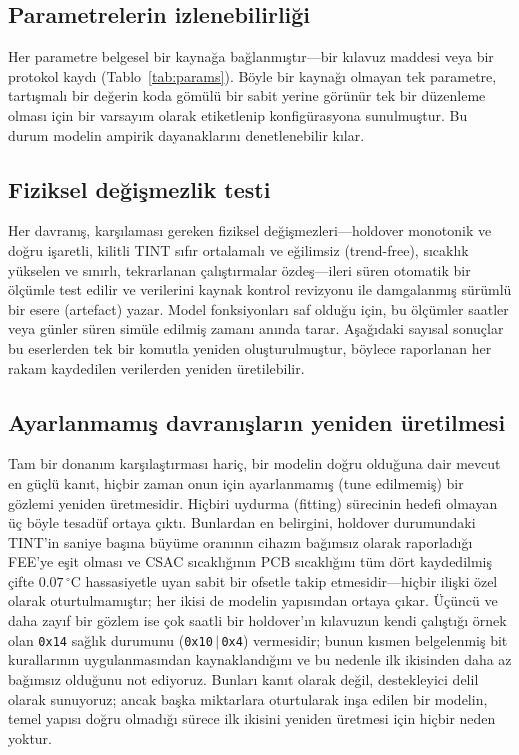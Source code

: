 \documentclass[9pt,twocolumn,a4paper]{extarticle}
\begin{document}
\subsection{Parametrelerin izlenebilirliği}
Her parametre belgesel bir kaynağa bağlanmıştır---bir kılavuz maddesi veya bir protokol kaydı (Tablo~\ref{tab:params}). Böyle bir kaynağı olmayan tek parametre, tartışmalı bir değerin koda gömülü bir sabit yerine görünür tek bir düzenleme olması için bir varsayım olarak etiketlenip konfigürasyona sunulmuştur. Bu durum modelin ampirik dayanaklarını denetlenebilir kılar.

\subsection{Fiziksel değişmezlik testi}
Her davranış, karşılaması gereken fiziksel değişmezleri---holdover monotonik ve doğru işaretli, kilitli TINT sıfır ortalamalı ve eğilimsiz (trend-free), sıcaklık yükselen ve sınırlı, tekrarlanan çalıştırmalar özdeş---ileri süren otomatik bir ölçümle test edilir ve verilerini kaynak kontrol revizyonu ile damgalanmış sürümlü bir esere (artefact) yazar. Model fonksiyonları saf olduğu için, bu ölçümler saatler veya günler süren simüle edilmiş zamanı anında tarar. Aşağıdaki sayısal sonuçlar bu eserlerden tek bir komutla yeniden oluşturulmuştur, böylece raporlanan her rakam kaydedilen verilerden yeniden üretilebilir.

\subsection{Ayarlanmamış davranışların yeniden üretilmesi}
Tam bir donanım karşılaştırması hariç, bir modelin doğru olduğuna dair mevcut en güçlü kanıt, hiçbir zaman onun için ayarlanmamış (tune edilmemiş) bir gözlemi yeniden üretmesidir. Hiçbiri uydurma (fitting) sürecinin hedefi olmayan üç böyle tesadüf ortaya çıktı. Bunlardan en belirgini, holdover durumundaki TINT'in saniye başına büyüme oranının cihazın bağımsız olarak raporladığı FEE'ye eşit olması ve CSAC sıcaklığının PCB sıcaklığını tüm dört kaydedilmiş çifte $0.07\,^\circ$C hassasiyetle uyan sabit bir ofsetle takip etmesidir---hiçbir ilişki özel olarak oturtulmamıştır; her ikisi de modelin yapısından ortaya çıkar. Üçüncü ve daha zayıf bir gözlem ise çok saatli bir holdover'ın kılavuzun kendi çalıştığı örnek olan \texttt{0x14} sağlık durumunu (\texttt{0x10}\,$\vert$\,\texttt{0x4}) vermesidir; bunun kısmen belgelenmiş bit kurallarının uygulanmasından kaynaklandığını ve bu nedenle ilk ikisinden daha az bağımsız olduğunu not ediyoruz. Bunları kanıt olarak değil, destekleyici delil olarak sunuyoruz; ancak başka miktarlara oturtularak inşa edilen bir modelin, temel yapısı doğru olmadığı sürece ilk ikisini yeniden üretmesi için hiçbir neden yoktur.
\end{document}
